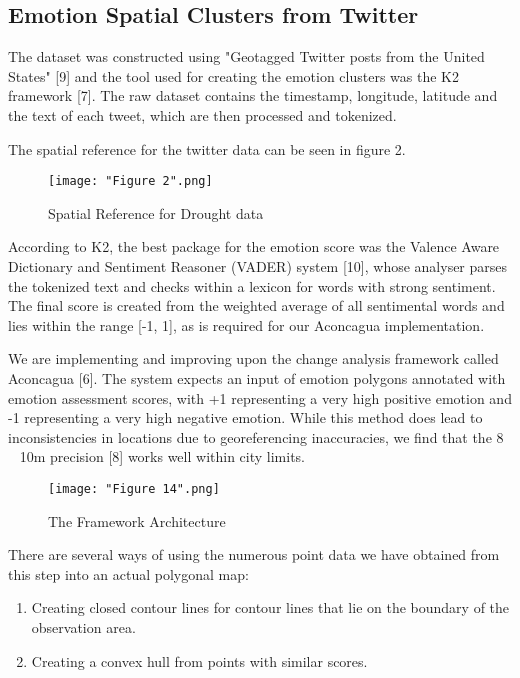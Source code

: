 \documentclass[conference]{IEEEtran}
\begin{document}
\subsection{Emotion Spatial Clusters from Twitter }

The dataset was constructed using "Geotagged Twitter posts from the United States" [9] and the tool used for creating the emotion clusters was the K2 framework [7]. The raw dataset contains the timestamp, longitude, latitude and the text of each tweet, which are then processed and tokenized.

The spatial reference for the twitter data can be seen in figure 2.
\begin{figure}[ht]
\centerline{\texttt{[image: "Figure 2".png]}}
\caption{Spatial Reference for Drought data}
\label{Figure 2}
\end{figure}

According to K2, the best package for the emotion score was the Valence Aware Dictionary and Sentiment Reasoner (VADER) system [10], whose analyser parses the tokenized text and checks within a lexicon for words with strong sentiment. The final score is created from the weighted average of all sentimental words and lies within the range [-1, 1], as is required for our Aconcagua implementation.

We are implementing and improving upon the change analysis framework called Aconcagua [6]. The system expects an input of emotion polygons annotated with emotion assessment scores, with +1 representing a very high positive emotion and -1 representing a very high negative emotion. While this method does lead to inconsistencies in locations due to georeferencing inaccuracies, we find that the 8 ~ 10m precision [8] works well within city limits.

\begin{figure}[ht]
\centerline{\texttt{[image: "Figure 14".png]}}
\caption{The Framework Architecture}
\label{Figure 13}
\end{figure}


There are several ways of using the numerous point data we have obtained from this step into an actual polygonal map: 

\begin{enumerate}

\item Creating closed contour lines for contour lines that lie on the boundary of the observation area.
\item Creating a convex hull from points with similar scores.
\end{enumerate}
\end{document}
